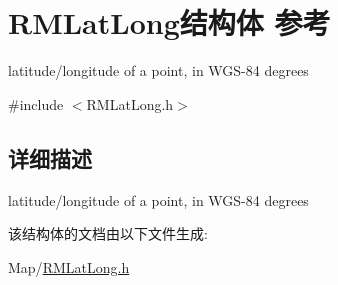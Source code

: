 \hypertarget{struct_r_m_lat_long}{\section{R\-M\-Lat\-Long结构体 参考}
\label{struct_r_m_lat_long}
}


latitude/longitude of a point, in W\-G\-S-\/84 degrees  




{\ttfamily \#include $<$R\-M\-Lat\-Long.\-h$>$}



\subsection{详细描述}
latitude/longitude of a point, in W\-G\-S-\/84 degrees 

该结构体的文档由以下文件生成\-:\begin{DoxyCompactItemize}
\item 
Map/\hyperlink{_r_m_lat_long_8h}{R\-M\-Lat\-Long.\-h}\end{DoxyCompactItemize}
